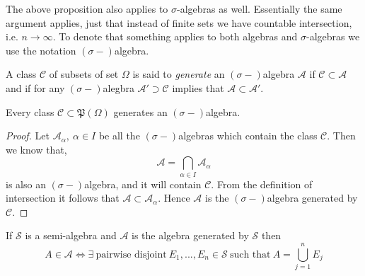 \begin{remark}
The above proposition also applies to $\sigma$-algebras as well. Essentially the same argument applies, just that instead of finite sets we have countable intersection, i.e. $n\to \infty$. To denote that something applies to both algebras and $\sigma$-algebras we use the notation $(\sigma-)$algebra.
\end{remark}
\begin{definition}
  A class $\mathscr{C}$ of subsets of set $\Omega$ is said to \textit{generate} an $(\sigma-)$algebra $\mathscr{A}$ if $\mathscr{C}\subset \mathscr{A}$ and if for any $(\sigma-)$alegbra $\mathscr{A}'\supset \mathscr{C}$ implies that $\mathscr{A}\subset \mathscr{A}'$.
\end{definition}
\begin{proposition}
  Every class $\mathscr{C}\subset \mathfrak{P} (\Omega)$ generates an $(\sigma-)$algebra.
\end{proposition}
\begin{proof}
  Let $\mathscr{A}_\alpha,\ \alpha\in I$ be all the $(\sigma-)$algebras which contain the class $\mathscr{C}$. Then we know that,
  \[\mathscr{A} = \bigcap_{\alpha\in I} \mathscr{A}_\alpha\]
  is also an $(\sigma-)$algebra, and it will contain $\mathscr{C}$. From the definition of intersection it follows that $\mathscr{A}\subset \mathscr{A}_\alpha$. Hence $\mathscr{A}$ is the $(\sigma-)$algebra generated by $\mathscr{C}$.
\end{proof}
\begin{lemma}\label{lem:generated}
  If $\mathscr{S}$ is a semi-algebra and $\mathscr{A}$ is the algebra generated by $\mathscr{S}$ then
  \[A\in \mathscr{A} \iff \exists\ \text{pairwise disjoint}\ E_1,...,E_n\in\mathscr{S}\ \text{such that}\ A = \bigcup_{j=1}^{n} E_j \]
\end{lemma}
